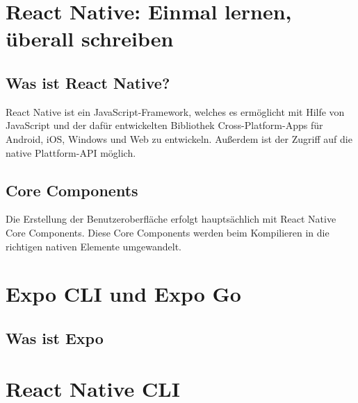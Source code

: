 \section{React Native: Einmal lernen, überall schreiben}
\label{reactnative}

\subsection{Was ist React Native?}
React Native ist ein JavaScript-Framework, welches es ermöglicht mit Hilfe von JavaScript und der
dafür entwickelten Bibliothek  Cross-Platform-Apps für Android, iOS, Windows und
Web zu entwickeln. Außerdem ist der Zugriff auf die native Plattform-API möglich.

\subsection{Core Components}
Die Erstellung der Benutzeroberfläche erfolgt hauptsächlich mit React Native Core Components. Diese
Core Components werden beim Kompilieren in die richtigen nativen Elemente umgewandelt.



\section{Expo CLI und Expo Go}
\subsection{Was ist Expo}


\section{React Native CLI}